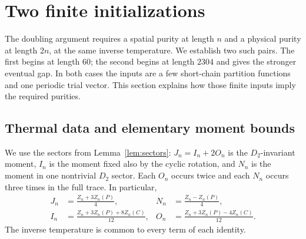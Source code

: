 \section{Two finite initializations}\label{sec:initialization}

The doubling argument requires a spatial purity at length $n$ and a physical
purity at length $2n$, at the same inverse temperature.  We establish two such
pairs.  The first begins at length $60$; the second begins at length $2304$ and
gives the stronger eventual gap.  In both cases the inputs are a few short-chain
partition functions and one periodic trial vector.  This section explains how
those finite inputs imply the required purities.

\subsection{Thermal data and elementary moment bounds}

We use the sectors from Lemma~\ref{lem:sectors}: $J_n=I_n+2O_n$ is the
$D_2$-invariant moment, $I_n$ is the moment fixed also by the cyclic rotation,
and $N_n$ is the moment in one nontrivial $D_2$ sector.  Each $O_n$ occurs twice
and each $N_n$ occurs three times in the full trace.  In particular,
\begin{equation}\label{eq:sector-inversion}
\begin{aligned}
 J_n&=\frac{Z_n+3Z_n(P)}4,&
 N_n&=\frac{Z_n-Z_n(P)}4,\\
 I_n&=\frac{Z_n+3Z_n(P)+8Z_n(C)}{12},&
 O_n&=\frac{Z_n+3Z_n(P)-4Z_n(C)}{12}.
\end{aligned}
\end{equation}
The inverse temperature is common to every term of each identity.

